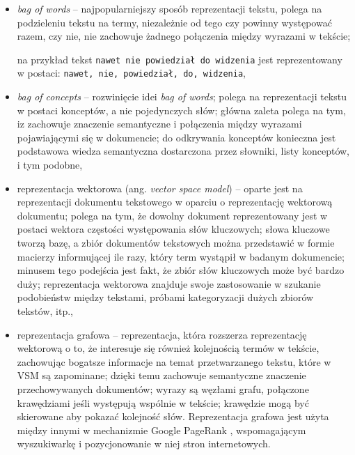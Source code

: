 \begin{itemize}
  \item \textit{bag of words} \cite{BOWordsAndBOConcepts} -- najpopularniejszy
  sposób reprezentacji tekstu, polega na podzieleniu tekstu na termy,
  niezależnie od tego czy powinny występować razem, czy nie, nie zachowuje
  żadnego połączenia między wyrazami w tekście; 
  
  na przykład tekst 
  \texttt{nawet nie powiedział do widzenia} jest reprezentowany w postaci:
  \texttt{nawet, nie, powiedział, do, widzenia},
  
  
  \item \textit{bag of concepts} \cite{BOWordsAndBOConcepts} -- rozwinięcie idei
  \textit{bag of words}; polega na reprezentacji tekstu w postaci konceptów,
  a nie pojedynczych słów; główna zaleta polega na tym, iz zachowuje znaczenie
  semantyczne i połączenia między wyrazami pojawiającymi się w dokumencie; do
  odkrywania konceptów konieczna jest podstawowa wiedza semantyczna dostarczona
  przez słowniki, listy konceptów, i tym podobne,
  
  \item reprezentacja wektorowa (ang. \textit{vector space model})
  \cite{VectorSpaceModel} -- oparte jest na reprezentacji dokumentu tekstowego w
  oparciu o reprezentację wektorową dokumentu; polega na tym, że dowolny
  dokument reprezentowany jest w postaci wektora częstości występowania słów
  kluczowych; słowa kluczowe tworzą bazę, a zbiór dokumentów tekstowych
  można przedstawić w formie macierzy informującej ile razy, który term wystąpił
  w badanym dokumencie; minusem tego podejścia jest fakt, że zbiór słów
  kluczowych może być bardzo duży; reprezentacja wektorowa znajduje swoje
  zastosowanie w szukanie podobieństw między tekstami, próbami kategoryzacji
  dużych zbiorów tekstów, itp.,
  
  \item reprezentacja grafowa \cite{GraphBasedTextModel} -- reprezentacja,
  która rozszerza reprezentację wektorową o to, że interesuje się również
  kolejnością termów w tekście, zachowując bogatsze informacje na temat
  przetwarzanego tekstu, które w VSM są zapominane; dzięki temu zachowuje
  semantyczne znaczenie przechowywanych dokumentów; wyrazy są węzłami grafu,
  połączone krawędziami jeśli występują wspólnie w tekście; krawędzie mogą być
  skierowane aby pokazać kolejność słów. Reprezentacja grafowa jest użyta między
  innymi w mechanizmie Google PageRank \cite{TextNetworkModel}, wspomagającym
  wyszukiwarkę i pozycjonowanie w niej stron internetowych.  
\end{itemize}

